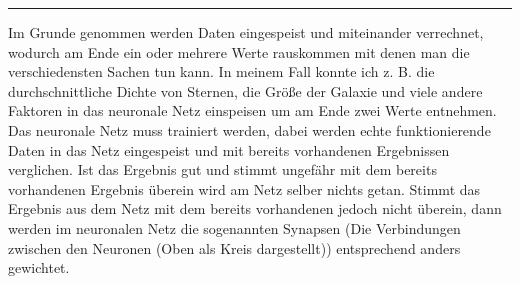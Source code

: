 \begin{center}
\end{center}
\bigskip

\hrule

Im Grunde genommen werden Daten eingespeist und miteinander verrechnet, wodurch
am Ende ein oder mehrere Werte rauskommen mit denen man die verschiedensten
Sachen tun kann. In meinem Fall konnte ich z. B. die durchschnittliche Dichte
von Sternen, die Größe der Galaxie und viele andere Faktoren in das neuronale
Netz einspeisen um am Ende zwei Werte entnehmen. Das neuronale Netz muss
trainiert werden, dabei werden echte funktionierende Daten in das Netz eingespeist
und mit bereits vorhandenen Ergebnissen verglichen. Ist das Ergebnis gut und
stimmt ungefähr mit dem bereits vorhandenen Ergebnis überein wird am Netz selber
nichts getan. Stimmt das Ergebnis aus dem Netz mit dem bereits vorhandenen
jedoch nicht überein, dann werden im neuronalen Netz die sogenannten Synapsen
(Die Verbindungen zwischen den Neuronen (Oben als Kreis dargestellt))
entsprechend anders gewichtet.

